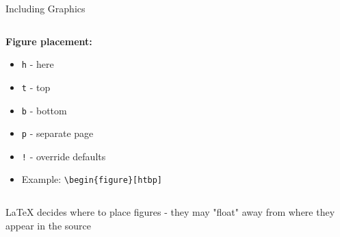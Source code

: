 \begin{frame}[fragile]{Including Graphics}
\begin{columns}
\begin{column}{0.5\textwidth}
               \textbf{Figure placement:}
               \begin{itemize}
                    \item \texttt{h} - here
                    \item \texttt{t} - top
                    \item \texttt{b} - bottom
                    \item \texttt{p} - separate page
                    \item \texttt{!} - override defaults
                    \item Example: \texttt{\textbackslash begin\{figure\}[htbp]}
               \end{itemize}
          \end{column}
     \end{columns}
     
     \begin{warning}
          LaTeX decides where to place figures - they may "float" away from where they appear in the source
     \end{warning}
\end{frame}

